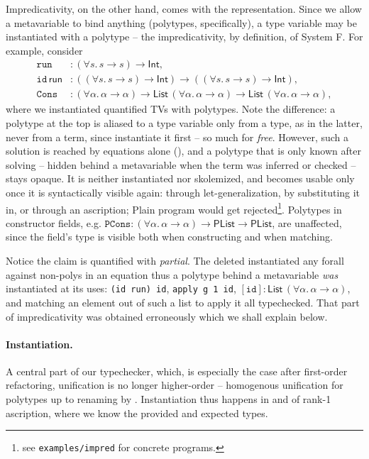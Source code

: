 \documentclass[a4paper, 11pt]{article}
\theoremstyle{remark}
\begin{document}
Impredicativity, on the other hand, comes with the representation. Since we allow a metavariable
to bind anything (polytypes, specifically), a type variable may be instantiated with a polytype
-- the impredicativity, by definition, of System F. For example, consider
\begin{align*}
  \texttt{run} &: (\forall s.\,s\to s)\to\textsf{Int},\\
  \texttt{id}\,\textsf{run} &: ((\forall s.\,s\to s)\to\textsf{Int})\to((\forall s.\,s\to s)\to\textsf{Int}),\\
  \texttt{Cons} &: (\forall\alpha.\,\alpha\to\alpha)\to\textsf{List}\,(\forall\alpha.\,\alpha\to\alpha)\to\textsf{List}\,(\forall\alpha.\,\alpha\to\alpha),
\end{align*}
where we instantiated quantified TVs with polytypes.
Note the difference: a polytype at the top is aliased to a type variable only from a type, as in the latter,
never from a term, since  instantiate it first -- so much for \textit{free}.
However, such a solution is reached by equations alone
(), and a polytype that is only known after solving -- hidden behind a
metavariable when the term was inferred or checked -- stays opaque. It is neither instantiated nor
skolemized, and becomes usable only once it is syntactically visible again: through let-generalization,
by substituting it in, or through an ascription; Plain program would get rejected\footnote{
  see \texttt{examples/impred} for concrete programs.
}.
Polytypes in constructor fields, e.g.
$\texttt{PCons} : (\forall\alpha.\,\alpha\to\alpha)\to\textsf{PList}\to\textsf{PList}$, are
unaffected, since the field's type is visible both when constructing and when matching.

Notice the claim is quantified with \textit{partial}. The deleted  instantiated any forall against
non-polys in an equation thus a polytype behind a metavariable \emph{was} instantiated at its uses:
\texttt{(id run) id}, \texttt{apply g 1 id}, $[\texttt{id}] : \textsf{List}\,(\forall\alpha.\,\alpha\to\alpha)$, and matching an element out of such a list to
apply it all typechecked. That part of impredicativity was obtained erroneously which we shall
explain below.

\paragraph{Instantiation.}
A central part of our typechecker, which, is especially the case after first-order refactoring,
unification is no longer higher-order -- homogenous unification for polytypes up to renaming
by . Instantiation thus happens in
 and  of rank-1 ascription, where we know
the provided and expected types.
\end{document}
